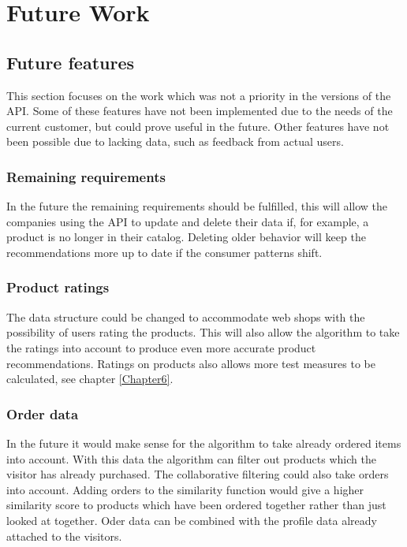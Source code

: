 
\chapter{Future Work} %

\label{Chapter9} %


\section{Future features}
This section focuses on the work which was not a priority in the versions of the API. Some of these features have not been implemented due to the needs of the current customer, but could prove useful in the future. Other features have not been possible due to lacking data, such as feedback from actual users.

\subsection{Remaining requirements}
In the future the remaining requirements should be fulfilled, this will allow the companies using the API to update and delete their data if, for example, a  product is no longer in their catalog. Deleting older behavior will keep the recommendations more up to date if the consumer patterns shift.

\subsection{Product ratings}
The data structure could be changed to accommodate web shops with the possibility of users rating the products. This will also allow the algorithm to take the ratings into account to produce even more accurate product recommendations. Ratings on products also allows more test measures to be calculated, see chapter \ref{Chapter6}.

\subsection{Order data}
In the future it would make sense for the algorithm to take already ordered items into account. With this data the algorithm can filter out products which the visitor has already purchased. The collaborative filtering could also take orders into account. Adding orders to the similarity function would give a higher similarity score to products which have been ordered together rather than just looked at together. Oder data can be combined with the profile data already attached to the visitors.


